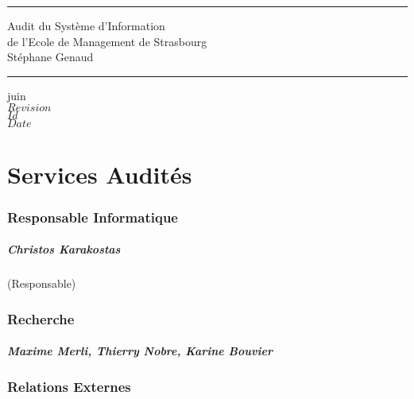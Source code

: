 \documentclass{book}
\begin{document}
\newcommand{\motcle}[1]{\index{#1}\emph{#1}}
\newcommand{\instrcle}[1]{\index{\texttt{#1}}\texttt{#1}}

\thispagestyle{empty}
\rhead[]{}
\pagestyle{fancy}
\setlength{\parindent}{0mm}
\setlength{\parskip}{0mm}
\rule{\linewidth}{1mm}
\begin{center}
\Large{Audit du Système d'Information}\\[5mm]
\Large{de l'Ecole de Management de Strasbourg}\\[5mm]
\large{Stéphane Genaud}
\rule{\linewidth}{1mm}
\end{center}
\begin{center}
juin  \\
\textrm{
$Revision$\\
$Id$\\
$Date$\\
}
\end{center}

\tableofcontents
\newpage

 
 

\chapter{Services Audités}
 

\subsection{Responsable Informatique}

\paragraph{Christos Karakostas} (Responsable)


\subsection{Recherche}
\paragraph{Maxime Merli, Thierry Nobre, Karine Bouvier}

\subsection{Relations Externes}
\end{document}
